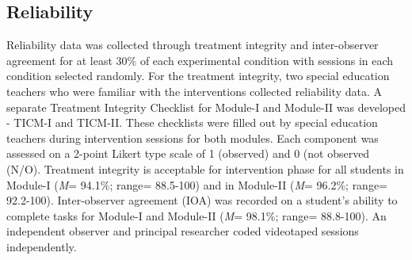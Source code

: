 \documentclass[11.5pt]{sig-alternate} %
\begin{document}
\begin{large}
\subsection*{Reliability}
Reliability data was collected through treatment integrity and inter-observer agreement for at least 30\% of each experimental condition with sessions in each condition selected randomly. For the treatment integrity, two special education teachers who were familiar with the interventions collected reliability data. A separate Treatment Integrity Checklist for Module-I and Module-II was developed - TICM-I and TICM-II. These checklists were filled out by special education teachers during intervention sessions for both modules. Each component was assessed on a 2-point Likert type scale of 1 (observed) and 0 (not observed (N/O). Treatment integrity is acceptable for intervention phase for all students in Module-I (\textit{M}= 94.1\%; range= 88.5-100) and in Module-II (\textit{M}= 96.2\%; range= 92.2-100). Inter-observer agreement (IOA) was recorded on a student’s ability to complete tasks for Module-I and Module-II (\textit{M}= 98.1\%; range= 88.8-100). An independent observer and principal researcher coded videotaped sessions independently.


\end{large}
\end{document}
